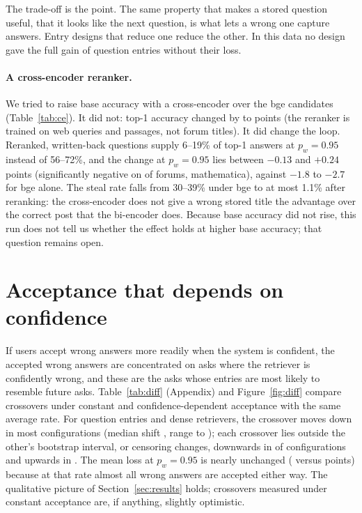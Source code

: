 \documentclass[11pt]{article}
\begin{document}
The trade-off is the point. The same property that makes a stored question useful, that it looks like the next question, is what lets a wrong one capture answers. Entry designs that reduce one reduce the other. In this data no design gave the full gain of question entries without their loss.

\paragraph{A cross-encoder reranker.} We tried to raise base accuracy with a cross-encoder over the bge candidates (Table~\ref{tab:ce}). It did not: top-1 accuracy changed by \ceGainMin{} to \ceGainMax{} points (the reranker is trained on web queries and passages, not forum titles). It did change the loop. Reranked, written-back questions supply 6--19\% of top-1 answers at $p_w=0.95$ instead of 56--72\%, and the change at $p_w=0.95$ lies between $-0.13$ and $+0.24$ points (significantly negative on \ceNeg{} of \ceN{} forums, mathematica), against $-1.8$ to $-2.7$ for bge alone. The steal rate falls from 30--39\% under bge to at most 1.1\% after reranking: the cross-encoder does not give a wrong stored title the advantage over the correct post that the bi-encoder does. Because base accuracy did not rise, this run does not tell us whether the effect holds at higher base accuracy; that question remains open.

\begin{table}[t]\centering\scriptsize

\caption{bge alone and bge with cross-encoder reranking (top 20), question entries, naive write-back. Self-share in the second half of the stream.}
\label{tab:ce}
\end{table}

\section{Acceptance that depends on confidence}
\label{sec:difficulty}
If users accept wrong answers more readily when the system is confident, the accepted wrong answers are concentrated on asks where the retriever is confidently wrong, and these are the asks whose entries are most likely to resemble future asks. Table~\ref{tab:diff} (Appendix) and Figure~\ref{fig:diff} compare crossovers under constant and confidence-dependent acceptance with the same average rate. For question entries and dense retrievers, the crossover moves down in most configurations (median shift \diffMedShift, range \diffMinShift{} to \diffMaxShift); each crossover lies outside the other's bootstrap interval, or censoring changes, downwards in \diffDown{} of \nDenseV{} configurations and upwards in \diffUp. The mean loss at $p_w=0.95$ is nearly unchanged (\diffDnnConst{} versus \diffDnnDiff{} points) because at that rate almost all wrong answers are accepted either way. The qualitative picture of Section~\ref{sec:results} holds; crossovers measured under constant acceptance are, if anything, slightly optimistic.
\end{document}
